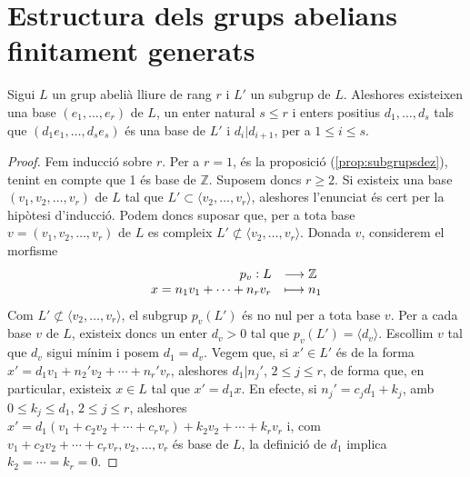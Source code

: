 \documentclass[../main.tex]{subfiles}
\begin{document}
\section{Estructura dels grups abelians finitament generats}
\begin{prop}\label{prop:existenciadeunabase}
Sigui $L$ un grup abelià lliure de rang $r$ i $L'$ un subgrup de $L$. Aleshores existeixen una base $(e_1,\ldots,e_r)$ de $L$, un enter natural $s\leq r$ i enters positius $d_1,\ldots,d_s$ tals que $(d_1e_1,\ldots,d_se_s)$ és una base de $L'$ i $d_i|d_{i+1}$, per a $1\leq i\leq s$.
\end{prop}
\begin{proof}
Fem inducció sobre $r$. Per a $r = 1$, és la proposició (\ref{prop:subgrupsdez}), tenint en compte que 1 és base de $\mathbb{Z}$. Suposem doncs $r\geq 2$. Si existeix una base $(v_1,v_2,\ldots,v_r)$ de $L$ tal que $L'\subset \langle v_2,\ldots,v_r\rangle$, aleshores l'enunciat és cert per la hipòtesi d'inducció. Podem doncs suposar que, per a tota base $v = (v_1,v_2,\ldots,v_r)$ de $L$ es compleix $L'\not\subset\langle v_2,\ldots,v_r\rangle$. Donada $v$, considerem el morfisme
\begin{equation}
    \notag
    \begin{array}{rl}
        p_v: L & \longrightarrow \mathbb{Z} \\
        x = n_1v_1+\cdots+n_rv_r & \longmapsto n_1
    \end{array}
\end{equation}
Com $L'\not\subset \langle v_2,\ldots,v_r\rangle$, el subgrup $p_v(L')$ és no nul per a tota base $v$. Per a cada base $v$ de $L$, existeix doncs un enter $d_v>0$ tal que $p_v(L') = \langle d_v\rangle$. Escollim $v$ tal que $d_v$ sigui mínim i posem $d_1 = d_v$. Vegem que, si $x'\in L'$ és de la forma $x' = d_1v_1 + n_2'v_2+\cdots+n_r'v_r$, aleshores $d_1|n_j'$, $2\leq j\leq r$, de forma que, en particular, existeix $x\in L$ tal que $x'=d_1x$. En efecte, si $n_j' = c_jd_1+k_j$, amb $0\leq k_j\leq d_1$, $2\leq j\leq r$, aleshores $x' = d_1(v_1+c_2v_2+\cdots+c_rv_r)+k_2v_2+\cdots+k_rv_r$ i, com $v_1+c_2v_2+\cdots+c_rv_r,v_2,\ldots,v_r$ és base de $L$, la definició de $d_1$ implica $k_2 = \cdots = k_r = 0$.


\end{proof}
\end{document}
